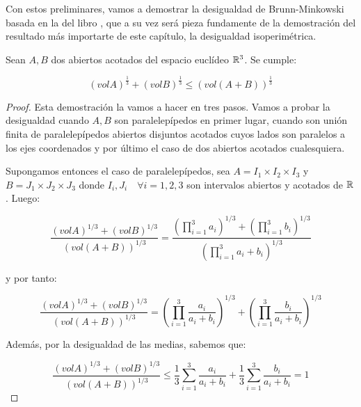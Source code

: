 Con estos preliminares, vamos a demostrar la desigualdad de Brunn-Minkowski basada en la del libro \cite{montielrosbook}, que a su vez será pieza fundamente de la demostración del resultado más importarte de este capítulo, la desigualdad isoperimétrica.
\begin{theorem}
Sean $A, B$ dos abiertos acotados del espacio euclídeo $\mathbb{R}^3$. Se cumple:

\begin{equation*}
    (vol A)^{\frac{1}{3}} + (vol B)^{\frac{1}{3}} \leq (vol (A+B))^{\frac{1}{3}}
\end{equation*}
\end{theorem}
\begin{proof}
Esta demostración la vamos a hacer en tres pasos. Vamos a probar la desigualdad cuando $A,B$ son paralelepípedos en primer lugar, cuando son unión finita de paralelepípedos abiertos disjuntos acotados cuyos lados son paralelos a los ejes coordenados y por último el caso de dos abiertos acotados cualesquiera.

Supongamos entonces el caso de paralelepípedos, sea $A = I_1 \times I_2 \times I_3$ y $B = J_1 \times J_2 \times J_3$ donde $I_i,J_i \quad \forall i=1,2,3$ son intervalos abiertos y acotados de $\mathbb{R}$. Luego:

\begin{equation*}
    \frac{ \left(vol A \right)^{1/3} + \left(vol B \right)^{1/3}}{\left(vol (A+B) \right)^{1/3}} = \frac{\left(\displaystyle\prod_{i=1}^3 a_i \right)^{1/3} + \left(\displaystyle\prod_{i=1}^3 b_i \right)^{1/3}}{\left(\displaystyle\prod_{i=1}^3 a_i+b_i \right)^{1/3}}
\end{equation*}

y por tanto:

\begin{equation*}
    \frac{ \left(vol A \right)^{1/3} + \left(vol B \right)^{1/3}}{\left(vol (A+B) \right)^{1/3}} = \left(\displaystyle\prod_{i=1}^3 \frac{a_i}{a_i+b_i} \right)^{1/3} + \left(\displaystyle\prod_{i=1}^3 \frac{b_i}{a_i+b_i} \right)^{1/3}
\end{equation*}

Además, por la desigualdad de las medias, sabemos que:

\begin{equation*}
    \frac{ \left(vol A \right)^{1/3} + \left(vol B \right)^{1/3}}{\left(vol (A+B) \right)^{1/3}} \leq
    \frac{1}{3} \displaystyle\sum_{i=1}^3 \frac{a_i}{a_i+b_i} + \frac{1}{3} \displaystyle\sum_{i=1}^3 \frac{b_i}{a_i+b_i} = 1
\end{equation*}


\end{proof}
